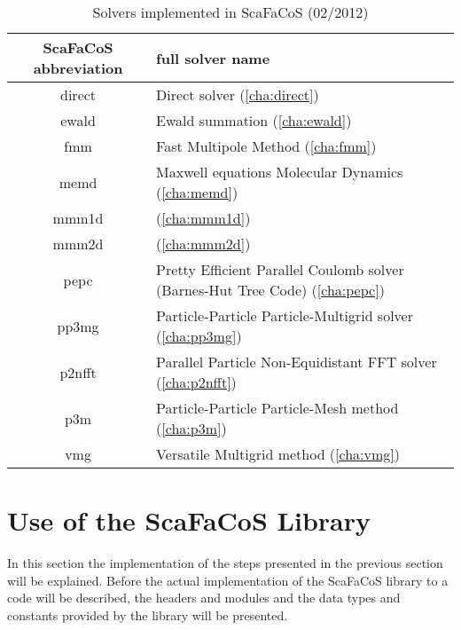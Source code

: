 \begin{table}[tbp]
\begin{center}
\begin{tabular}{|c|p{}|}
\hline
  ScaFaCoS abbreviation         &    full solver name     \\
\hline
\hline
  direct                        &    Direct solver (\ref{cha:direct})       \\
\hline
  ewald                         &    Ewald summation (\ref{cha:ewald})              \\
\hline
  fmm                           &    Fast Multipole Method (\ref{cha:fmm}) \\
\hline
  memd                          &    Maxwell equations Molecular Dynamics (\ref{cha:memd})\\
\hline
  mmm1d                         &    (\ref{cha:mmm1d})\\
\hline
  mmm2d                         &    (\ref{cha:mmm2d})\\
\hline
  pepc                          &    Pretty Efficient Parallel Coulomb solver (Barnes-Hut Tree Code) (\ref{cha:pepc})\\
\hline
  pp3mg                         &    Particle-Particle Particle-Multigrid solver (\ref{cha:pp3mg}) \\
\hline
  p2nfft                        &    Parallel Particle Non-Equidistant FFT solver (\ref{cha:p2nfft})\\
\hline
  p3m                           &    Particle-Particle Particle-Mesh method (\ref{cha:p3m})\\
\hline
  vmg                           &    Versatile Multigrid method (\ref{cha:vmg})\\
\hline
\end{tabular}
\end{center}
\caption{Solvers implemented in ScaFaCoS (02/2012)}
\label{tab:solver_overview}
\end{table}

\section{Use of the ScaFaCoS Library}

In this section the implementation of the steps presented in the previous section will be explained. Before the actual implementation
of the ScaFaCoS library to a code will be described, the headers and modules and the data types and constants provided by the library
will be presented.

